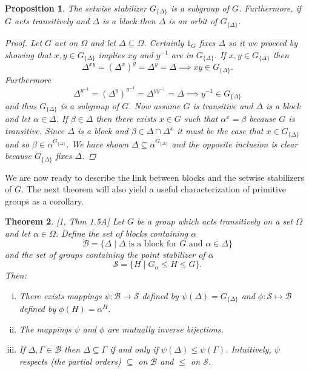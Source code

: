 \documentclass[]{article}
\newtheorem{thm}{Theorem}[section]
\newtheorem{prop}[thm]{Proposition}
\theoremstyle{definition}
\begin{document}
\begin{prop} \label{prop:setwise}
	The setwise stabilizer $G_{\{\Delta \}}$ is a subgroup of $G$. Furthermore, if $G$ acts transitively and $\Delta$ is a block then $\Delta$ is an orbit of $G_{\{\Delta \}}$.
	\begin{proof}
		Let $G$ act on $\Omega$ and let $\Delta \subseteq \Omega$. Certainly $1_G$ fixes $\Delta$ so it we proceed by showing that $x,y \in G_{\{\Delta \}}$ implies $xy$ and $y^{-1}$ are in $G_{\{\Delta \}}$. If $x,y \in G_{\{\Delta \}}$ then $$\Delta^{xy} = (\Delta^x)^y = \Delta^y = \Delta \implies xy \in G_{\{\Delta \}}.$$
		Furthermore $$\Delta^{y^{-1}} = (\Delta^y)^{y^{-1}} = \Delta^{yy^{-1}} = \Delta \implies y^{-1} \in G_{\{\Delta \}}$$
		and thus $G_{\{\Delta \}}$ is a subgroup of $G$. Now assume $G$ is transitive and $\Delta$ is a block and let $\alpha \in \Delta$. If $\beta \in \Delta$ then there exists $x \in G$ such that $\alpha^x = \beta$ because $G$ is transitive. Since $\Delta$ is a block and $\beta \in \Delta \cap \Delta^x$ it must be the case that $x \in G_{\{\Delta \}}$ and so $\beta \in \alpha^{G_{\{\Delta \}}}$. We have shown $\Delta \subseteq \alpha^{G_{\{\Delta \}}}$ and the opposite inclusion is clear because ${G_{\{\Delta \}}}$ fixes $\Delta$.
	\end{proof}
\end{prop}

We are now ready to describe the link between blocks and the setwise stabilizers of $G$. The next theorem will also yield a useful characterization of primitive groups as a corollary.

\begin{thm} \emph{[1, Thm 1.5A]}
Let $G$ be a group which acts transitively on a set $\Omega$ and let $\alpha \in \Omega$. Define the set of blocks containing $\alpha$
$$ \mathcal{B} = \{ \Delta \; | \; \Delta \mbox{ is a block for } G \mbox{ and } \alpha \in \Delta \}$$
and the set of groups containing the point stabilizer of $\alpha$
$$\mathcal{S} = \{H \; | \; G_\alpha \leqslant H \leqslant G \}.$$
Then:
\begin{enumerate}[(i)]
\item There exists mappings $\psi:\mathcal{B} \rightarrow \mathcal{S}$ defined by $\psi(\Delta) = G_{\{\Delta \}}$ and $\phi:\mathcal{S} \mapsto \mathcal{B}$ defined by $\phi(H) = \alpha^H$.
\vspace{-0.2cm} \item The mappings $\psi$ and $\phi$ are mutually inverse bijections.
\vspace{-0.2cm} \item If $\Delta, \Gamma \in \mathcal{B}$ then $\Delta \subseteq \Gamma$ if and only if $\psi(\Delta) \leqslant \psi(\Gamma)$. Intuitively, $\psi$ respects (the partial orders) $\subseteq$ on $\mathcal{B}$ and $\leqslant$ on $\mathcal{S}$.
\end{enumerate}

\end{thm}
\end{document}
